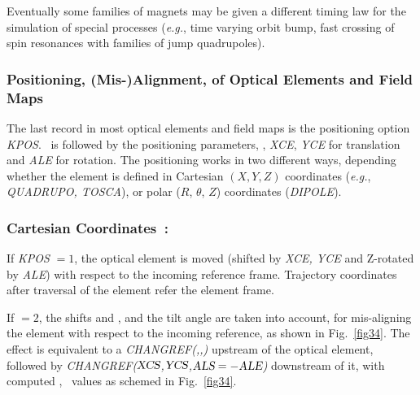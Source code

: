 \noindent Eventually some families of magnets may be given a different timing law 
    for the simulation of special processes (\emph{e.g.}, time varying orbit bump, 
fast crossing of spin resonances with families of jump quadrupoles). 





\subsubsection{Positioning, 
(Mis-)Alignment, 
of Optical Elements  and Field Maps} \label{sec4.6.2} 

The last record in most optical elements and field maps is the positioning option 
\textsl{KPOS}. \KPOS\ is followed by the positioning parameters, 
\eg, \textsl{XCE}, \textsl{YCE} 
for translation and \textsl{ALE} for rotation. The positioning works in two different ways, 
depending  whether the element is  defined in 
Cartesian $ (X, Y, Z) $ coordinates (\emph{e.g.}, \textsl{QUADRUPO, TOSCA}),
 or polar 
 ($R$, $\theta$, $Z$)  coordinates (\textsl{DIPOLE}). 
 
 \subsubsection*{Cartesian Coordinates~: } 
 
 If \textsl{KPOS} $ =1$, the optical element is moved (shifted by \textsl{XCE, YCE} and Z-rotated by 
\textsl{ALE}) with respect to the incoming reference frame. Trajectory coordinates after traversal of the 
element refer the element frame. 

\medskip

\noindent If  \KPOS$=2 $, the shifts  \XCE{}   
and   \YCE{}, and the tilt angle \ALE{}   are taken into 
account, for mis-aligning  the element with respect to the incoming 
reference, as shown in Fig.~\ref{fig34}.  
The effect is equivalent to  a \textsl{CHANGREF(\XCE,\YCE,\ALE)}  upstream of the 
optical element, followed by   \textsl{CHANGREF($\textsl{XCS}$,$\textsl{YCS}$,$\textsl{ALS}=-\textsl{ALE}$)} downstream of it, with 
 computed \XCS, \YCS\ values as schemed in Fig.~\ref{fig34}.  

\medskip

